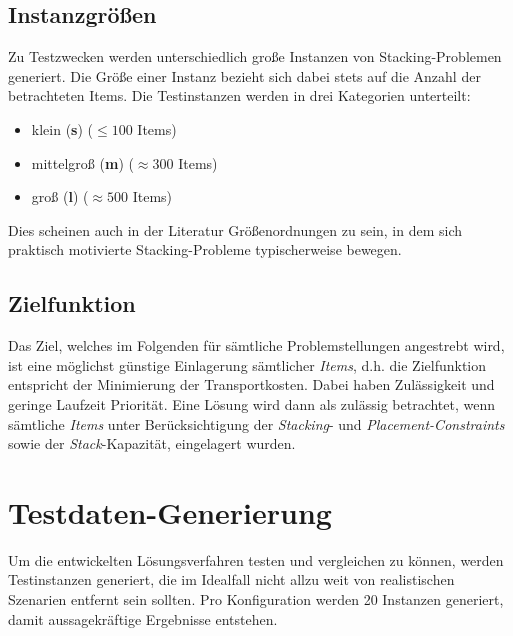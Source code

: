 \subsection{Instanzgrößen}
\label{sec:instance_sizes}

Zu Testzwecken werden unterschiedlich große Instanzen von Stacking-Problemen generiert. Die Größe einer
Instanz bezieht sich dabei stets auf die Anzahl der betrachteten Items. Die Testinstanzen werden
in drei Kategorien unterteilt:
\begin{itemize}
  \item klein (\textbf{s}) ($\leq 100$ Items)
  \item mittelgroß (\textbf{m}) ($\approx 300$ Items)
  \item groß (\textbf{l}) ($\approx 500$ Items)\newline
\end{itemize}
Dies scheinen auch in der Literatur Größenordnungen zu sein, in dem sich praktisch motivierte Stacking-Probleme
typischerweise bewegen. \cite{Le2016}

\subsection{Zielfunktion}
\label{sec:objective}

Das Ziel, welches im Folgenden für sämtliche Problemstellungen angestrebt wird, ist eine möglichst günstige Einlagerung
sämtlicher \textit{Items}, d.h. die Zielfunktion entspricht der Minimierung der Transportkosten.
Dabei haben Zulässigkeit und geringe Laufzeit Priorität.
Eine Lösung wird dann als zulässig betrachtet, wenn sämtliche \textit{Items} unter Berücksichtigung der \textit{Stacking}- und \textit{Placement-Constraints} sowie der \textit{Stack}-Kapazität, eingelagert wurden.


\pagebreak

\section{Testdaten-Generierung}
\label{sec:test_data}

Um die entwickelten Lösungsverfahren testen und vergleichen zu können, werden Testinstanzen generiert,
die im Idealfall nicht allzu weit von realistischen Szenarien entfernt sein sollten.
Pro Konfiguration werden 20 Instanzen generiert, damit aussagekräftige Ergebnisse entstehen.

